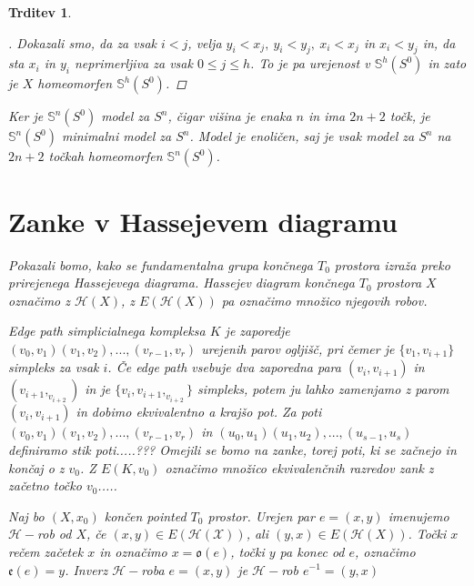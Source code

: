 \documentclass[a4paper,12pt]{article}
\DeclareRobustCommand{\h}{
    \mathcal{H}
}
\theoremstyle{definition}
\theoremstyle{plain}
\newtheorem{izrek}{Izrek}
\theoremstyle{definition}
\theoremstyle{plain}
\newtheorem{trditev}{Trditev}
\theoremstyle{plain}
\theoremstyle{plain}
\theoremstyle{plain}
\newenvironment{dokaz}{\begin{proof}[\bfseries\upshape\proofname]}{\end{proof}}
\begin{document}
\begin{trditev}
\begin{dokaz}
        Dokazali smo, da za vsak $i<j$,  velja $y_i < x_j,\ y_i < y_j,\ x_i < x_j$ in
        $x_i < y_j$ in, da sta $x_i$ in $y_i$ neprimerljiva za vsak $0\leq j \leq h$.
        To je pa urejenost v $\mathds{S}^h(S^0)$ in zato je $X$ homeomorfen 
        $\mathds{S}^h(S^0)$.

\end{dokaz}



Ker je $\mathds{S}^n(S^0)$ model za $S^n$, čigar višina je enaka $n$ in ima 
$2n+2$ točk, je $\mathds{S}^n(S^0)$ minimalni model za $S^n$. Model je 
enoličen, saj je vsak model za $S^n$ na $2n+2$ točkah homeomorfen 
$\mathds{S}^n(S^0)$.




\section{Zanke v Hassejevem diagramu}

Pokazali bomo, kako se fundamentalna grupa končnega $T_0$ 
prostora izraža preko prirejenega Hassejevega diagrama.
Hassejev diagram končnega $T_0$ prostora $X$ označimo z 
$\h(X)$, z $E(\h(X))$ pa označimo množico njegovih robov.

\textit{Edge path} simplicialnega kompleksa $K$ je zaporedje
$(v_0,v_1)(v_1,v_2),...,(v_{r-1},v_{r})$ urejenih parov 
ogljišč, pri čemer je $\{v_1,v_{i+1}\}$ simpleks za vsak $i$. 
Če \textit{edge path} vsebuje dva zaporedna para 
$(v_i,v_{i+1})$ in $(v_{i+1},_v_{i+2})$ in je 
$\{v_i,v_{i+1},_v_{i+2}\}$ simpleks, potem ju lahko 
zamenjamo z parom $(v_i,v_{i+1})$ in dobimo ekvivalentno a 
krajšo pot. Za poti $(v_0,v_1)(v_1,v_2),...,(v_{r-1},v_{r})$ 
in $(u_0,u_1)(u_1,u_2),...,(u_{s-1},u_{s})$ definiramo stik 
poti.....???
Omejili se bomo na zanke, torej poti, ki se začnejo in končaj
o z $v_0$. Z $E(K,v_0)$ označimo množico ekvivalenčnih razredov
 zank z začetno točko $v_0$.....


Naj bo $(X,x_0)$ končen pointed $T_0$ prostor. Urejen par 
$e=(x,y)$ imenujemo $\mathcal{H}-$rob od $X$, če $(x,y)\in 
E(\mathcal{H}(\mathcal{X}))$, ali $(y,x)\in 
E(\h(X))$. Točki $x$ rečem \textit{začetek} $x$ in označimo 
$x=\mathfrak{o}(e)$, točki $y$ pa \textit{konec} od $e$, 
označimo $\mathfrak{e}(e)=y$. \textit{Inverz} $\h-$roba $e=(x,y)$ je $\h-$rob $e^{-1}=(y,x)$


\end{trditev}
\end{document}
